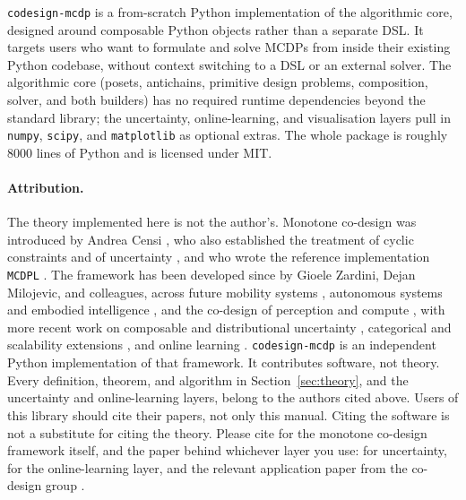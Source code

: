 \documentclass[11pt,a4paper]{article}
\newcommand{\codename}{\texttt{codesign-mcdp}}
\begin{document}
\codename{} is a from-scratch Python implementation of the algorithmic
core, designed around composable Python objects rather than a separate
DSL. It targets users who want to formulate and solve MCDPs from inside
their existing Python codebase, without context switching to a DSL or an
external solver. The algorithmic core (posets, antichains, primitive
design problems, composition, solver, and both builders) has no required
runtime dependencies beyond the standard library; the uncertainty,
online-learning, and visualisation layers pull in \texttt{numpy},
\texttt{scipy}, and \texttt{matplotlib} as optional extras. The whole
package is roughly 8000 lines of Python and is licensed under MIT.

\paragraph{Attribution.} The theory implemented here is not the
author's. Monotone co-design was introduced by Andrea Censi
\citep{censi2015mathematical,censi2016everything}, who also established
the treatment of cyclic constraints \citep{censi2017cyclic} and of
uncertainty \citep{censi2017uncertainty}, and who wrote the reference
implementation \texttt{MCDPL} \citep{mcdpl}. The framework has been
developed since by Gioele Zardini, Dejan Milojevic, and colleagues,
across future mobility systems
\citep{zardini2020towards,zardini2020avmobility,zardini2023tools},
autonomous systems and embodied intelligence
\citep{zardini2021autonomous,zardini2021embodied,zardini2022taskdriven},
and the co-design of perception and compute
\citep{milojevic2025codei}, with more recent work on composable and
distributional uncertainty
\citep{huang2025composable,furter2026symmetric,huang2026distributional},
categorical and scalability extensions
\citep{riess2026quantale,cai2026scalable}, and online learning
\citep{alharbi2026online}. \codename{} is an independent Python
implementation of that framework. It contributes software, not theory.
Every definition, theorem, and algorithm in
Section~\ref{sec:theory}, and the uncertainty and online-learning
layers, belong to the authors cited above. Users of this library should
cite their papers, not only this manual. Citing the software is not a
substitute for citing the theory. Please cite \citet{censi2015mathematical}
for the monotone co-design framework itself, and the paper behind whichever
layer you use: \citet{censi2017uncertainty} for uncertainty,
\citet{alharbi2026online} for the online-learning layer, and the relevant
application paper from the co-design group
\citep{zardini2020avmobility,milojevic2025codei}.
\end{document}
